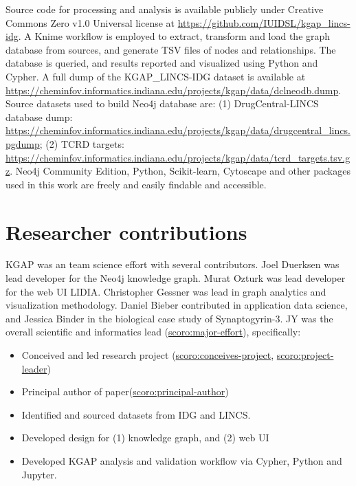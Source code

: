 Source code for processing and analysis is available publicly under Creative Commons Zero v1.0 Universal license at  \href{https://github.com/IUIDSL/kgap\_lincs-idg}{https://github.com/IUIDSL/kgap\_lincs-idg}. A Knime workflow is employed to extract, transform and load the graph database from sources, and generate TSV files of nodes and relationships. The database is queried, and results reported and visualized using Python and Cypher. A full dump of the KGAP\_LINCS-IDG dataset is available at \href{https://cheminfov.informatics.indiana.edu/projects/kgap/data/dclneodb.dump}{https://cheminfov.informatics.indiana.edu/projects/kgap/data/dclneodb.dump}. Source datasets used to build Neo4j database are: (1) DrugCentral-LINCS database dump: \href{https://cheminfov.informatics.indiana.edu/projects/kgap/data/drugcentral\_lincs.pgdump}{https://cheminfov.informatics.indiana.edu/projects/kgap/data/drugcentral\_lincs.pgdump}; (2) TCRD targets: \href{https://cheminfov.informatics.indiana.edu/projects/kgap/data/tcrd\_targets.tsv.gz}{https://cheminfov.informatics.indiana.edu/projects/kgap/data/tcrd\_targets.tsv.gz}. Neo4j Community Edition, Python, Scikit-learn, Cytoscape and other packages used in this work are freely and easily findable and accessible.

\section{Researcher contributions}

KGAP was an team science effort with several contributors. Joel Duerksen was lead developer for the Neo4j knowledge graph. Murat Ozturk was lead developer for the web UI LIDIA. Christopher Gessner was lead in graph analytics  and visualization methodology. Daniel Bieber contributed in application data science, and Jessica Binder in the biological case study of Synaptogyrin-3. JY was the overall scientific and informatics lead (\href{http://purl.org/spar/scoro/major-effort}{scoro:major-effort}), specifically:

\begin{itemize}[topsep=0pt,itemsep=0pt,partopsep=0pt,parsep=0pt]
    \item Conceived and led research project (\href{http://purl.org/spar/scoro/conceives-project}{scoro:conceives-project}, \href{http://purl.org/spar/scoro/project-leader}{scoro:project-leader})
    \item Principal author of paper(\href{http://purl.org/spar/scoro/principal-author}{scoro:principal-author})
    \item Identified and sourced datasets from IDG and LINCS.
    \item Developed design for (1) knowledge graph, and (2) web UI
    \item Developed KGAP analysis and validation workflow via Cypher, Python and Jupyter. 
\end{itemize}


